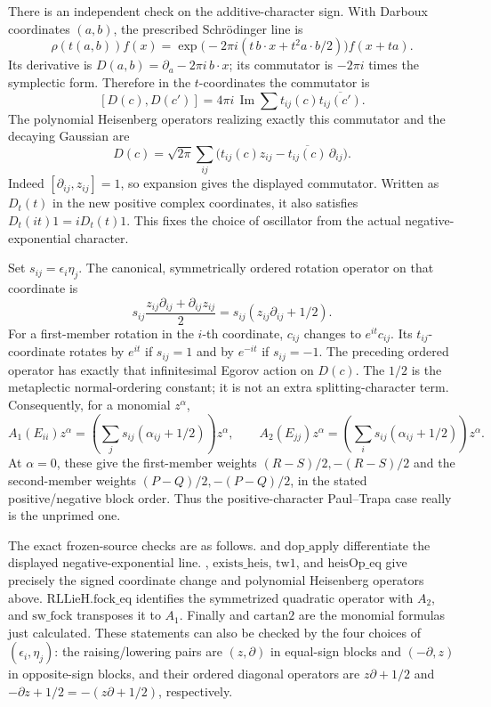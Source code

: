 There is an independent check on the additive-character sign.
With Darboux coordinates \((a,b)\), the prescribed
Schr\"odinger line is
\[
 \rho(t(a,b))f(x)=
       \exp\!\bigl(-2\pi i(t\,b\cdot x+t^2 a\cdot b/2)\bigr)
                                                          f(x+ta).
\]
Its derivative is
\(D(a,b)=\partial_a-2\pi i\,b\cdot x\);
its commutator is \(-2\pi i\) times the symplectic form.
Therefore in the \(t\)-coordinates the commutator is
\[
        [D(c),D(c')]=
            4\pi i\,\operatorname{Im}
                \sum t_{ij}(c)\overline{t_{ij}(c')}.
\]
The polynomial Heisenberg operators realizing exactly this
commutator and the decaying Gaussian are
\[
 D(c)=\sqrt{2\pi}\sum_{ij}
        \bigl(t_{ij}(c)z_{ij}
                         -\overline{t_{ij}(c)}\,\partial_{ij}\bigr).
\]
Indeed \([\partial_{ij},z_{ij}]=1\), so expansion gives
the displayed commutator. Written as \(D_t(t)\) in the
new positive complex coordinates, it also satisfies
\(D_t(it)1=iD_t(t)1\). This fixes the choice
of oscillator from the actual negative-exponential character.

Set \(s_{ij}=\epsilon_i\eta_j\).
The canonical, symmetrically ordered rotation operator
on that coordinate is
\[
              s_{ij}\frac{z_{ij}\partial_{ij}
                                  +\partial_{ij}z_{ij}}2
                 =s_{ij}(z_{ij}\partial_{ij}+1/2).
\]
For a first-member rotation in the \(i\)-th coordinate,
\(c_{ij}\) changes to \(e^{it}c_{ij}\).
Its \(t_{ij}\)-coordinate rotates by \(e^{it}\) if
\(s_{ij}=1\) and by \(e^{-it}\) if \(s_{ij}=-1\).
The preceding ordered operator has exactly that infinitesimal
Egorov action on \(D(c)\).
The \(1/2\) is the metaplectic normal-ordering constant;
it is not an extra splitting-character term.
Consequently, for a monomial \(z^\alpha\),
\[
 A_1(E_{ii})z^\alpha
   =\left(\sum_j s_{ij}(\alpha_{ij}+1/2)\right)z^\alpha,\qquad
 A_2(E_{jj})z^\alpha
   =\left(\sum_i s_{ij}(\alpha_{ij}+1/2)\right)z^\alpha.
\]
At \(\alpha=0\), these give the first-member weights
\((R-S)/2,-(R-S)/2\) and the second-member weights
\((P-Q)/2,-(P-Q)/2\), in the stated positive/negative
block order. Thus the positive-character Paul--Trapa
case really is the unprimed one.

The exact frozen-source checks are as follows.
 and
\(\mathrm{dop\_apply}\) differentiate the displayed
negative-exponential line.
,
\(\mathrm{exists\_heis}\), \(\mathrm{tw1}\), and
\(\mathrm{heisOp\_eq}\) give precisely the signed coordinate
change and polynomial Heisenberg operators above.
\(\mathrm{RLLieH.fock\_eq}\) identifies the symmetrized
quadratic operator with \(A_2\), and
\(\mathrm{sw\_fock}\) transposes it to \(A_1\).
Finally
and \(\mathrm{cartan2}\) are the monomial formulas just
calculated. These statements can also be checked by the
four choices of \((\epsilon_i,\eta_j)\):
the raising/lowering pairs are \((z,\partial)\)
in equal-sign blocks and \((-\partial,z)\)
in opposite-sign blocks, and their ordered diagonal
operators are \(z\partial+1/2\) and
\(-\partial z+1/2=-(z\partial+1/2)\), respectively.

